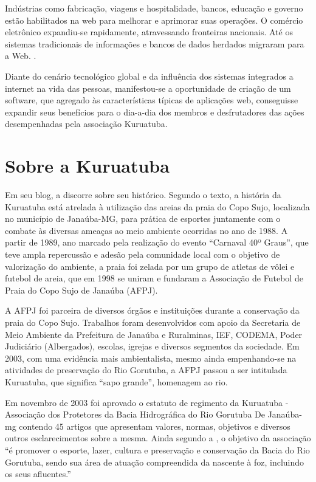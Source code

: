 \begin{citacao}
Indústrias como fabricação, viagens e hospitalidade, bancos, educação e governo estão habilitados na web para melhorar e aprimorar suas operações. O comércio eletrônico expandiu-se rapidamente, atravessando fronteiras nacionais. Até os sistemas tradicionais de informações e bancos de dados herdados migraram para a Web. \cite[p. 1]{ginige2001web}.
\end{citacao}

Diante do cenário tecnológico global e da influência dos sistemas integrados a internet na vida das pessoas, manifestou-se a oportunidade de criação de um software, que agregado às características típicas de aplicações web, conseguisse expandir seus benefícios para o dia-a-dia dos membros e desfrutadores das ações desempenhadas pela associação Kuruatuba.

\hspace{2.5cm}
\section{Sobre a Kuruatuba}
\hspace{2.5cm}

Em seu blog, a  discorre sobre seu histórico. Segundo o texto, a história da Kuruatuba está atrelada à utilização das areias da praia do Copo Sujo, localizada no município de Janaúba-MG, para prática de esportes juntamente com o combate às diversas ameaças ao meio ambiente ocorridas no ano de 1988. A partir de 1989, ano marcado pela realização do evento ``Carnaval 40º Graus'', que teve ampla repercussão e adesão pela comunidade local com o objetivo de valorização do ambiente, a praia foi zelada por um grupo de atletas de vôlei e futebol de areia, que em 1998 se uniram e fundaram a Associação de Futebol de Praia do Copo Sujo de Janaúba (AFPJ).

A AFPJ foi parceira de diversos órgãos e instituições durante a conservação da praia do Copo Sujo. Trabalhos foram desenvolvidos com apoio da Secretaria de Meio Ambiente da Prefeitura de Janaúba e Ruralminas, IEF, CODEMA, Poder Judiciário (Albergados), escolas, igrejas e diversos segmentos da sociedade. Em 2003, com uma evidência mais ambientalista, mesmo ainda empenhando-se na atividades de preservação do Rio Gorutuba, a AFPJ passou a ser intitulada Kuruatuba, que significa ``sapo grande'', homenagem ao rio.  

Em novembro de 2003 foi aprovado o estatuto de regimento da Kuruatuba - Associação dos Protetores da Bacia Hidrográfica do Rio Gorutuba De Janaúba-mg contendo 45 artigos que apresentam valores, normas, objetivos e diversos outros esclarecimentos sobre a mesma. Ainda segundo a \cite{Kuruatuba2011}, o objetivo da associação ``é promover o esporte, lazer, cultura e preservação e conservação da Bacia do Rio Gorutuba, sendo sua área de atuação compreendida da nascente à foz, incluindo os seus afluentes.''

